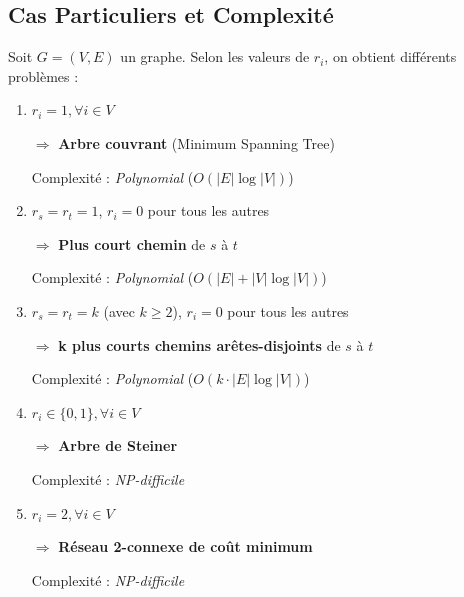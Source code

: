 \documentclass[12pt,a4paper]{article}
\begin{document}
\newpage
\subsection{Cas Particuliers et Complexité}

\begin{definition}
Soit $G = (V, E)$ un graphe. Selon les valeurs de $r_i$, on obtient différents problèmes :

\begin{enumerate}
    \item \textcolor{defvert}{$r_i = 1, \forall i \in V$}
    
    $\Rightarrow$ \textbf{Arbre couvrant} (Minimum Spanning Tree)
    
    Complexité : \textit{Polynomial} ($O(|E| \log |V|)$)
    
    \item \textcolor{defvert}{$r_s = r_t = 1$, $r_i = 0$ pour tous les autres}
    
    $\Rightarrow$ \textbf{Plus court chemin} de $s$ à $t$
    
    Complexité : \textit{Polynomial} ($O(|E| + |V| \log |V|)$)
    
    \item \textcolor{titrebleu}{$r_s = r_t = k$ (avec $k \geq 2$), $r_i = 0$ pour tous les autres}
    
    $\Rightarrow$ \textbf{k plus courts chemins arêtes-disjoints} de $s$ à $t$
    
    Complexité : \textit{Polynomial} ($O(k \cdot |E| \log |V|)$)
    
    \item \textcolor{importantrouge}{$r_i \in \{0, 1\}, \forall i \in V$}
    
    $\Rightarrow$ \textbf{Arbre de Steiner}
    
    Complexité : \textit{NP-difficile}
    
    \item \textcolor{importantrouge}{$r_i = 2, \forall i \in V$}
    
    $\Rightarrow$ \textbf{Réseau 2-connexe de coût minimum}
    
    Complexité : \textit{NP-difficile}
\end{enumerate}
\end{definition}
\end{document}
